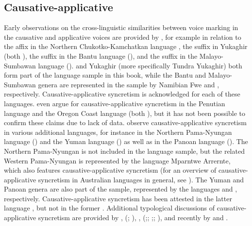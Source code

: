 \subsection{Causative-applicative} \label{sec:simple-syncretism:caus-appl}
Early observations on the cross-linguistic similarities between voice marking in the causative and applicative voices are provided by \cite[36f.]{nedjalkov:silnickij:1969}, for example in relation to the affix  in the Northern Chukotko-Kamchatkan language , the suffix  in Yukaghir (both ), the suffix  in the Bantu language  (), and the suffix  in the Malayo-Sumbawan language  ().  and Yukaghir (more specifically Tundra Yukaghir) both form part of the language sample in this book, while the Bantu and Malayo-Sumbawan genera are represented in the sample by Namibian Fwe and , respectively. Causative-applicative syncretism is acknowledged for each of these languages. \citeauthor{nedjalkov:silnickij:1969} even argue for causative-applicative syncretism in the Penutian language  and the Oregon Coast language  (both ), but it has not been possible to confirm these claims due to lack of data. \cite[116ff.]{shibatani:pardeshi:2002} observe cau\-sa\-tive-applicative syncretism in various additional languages, for instance in the Northern Pama-Nyungan language  () and the Yuman language  () as well as in the Panoan language  (). The Northern Pama-Nyungan  is not included in the language sample, but the related Western Pama-Nyungan  is represented by the language Mparntwe Arrernte, which also features causative-applicative syncretism (for an overview of causative-applicative syncretism in Australian languages in general, see \citealt{austin:2005}). The Yuman and Panoan genera are also part of the sample, represented by the languages  and , respectively. Causative-applicative syncretism has been attested in the latter language \citep{tallman:2018}, but not in the former \citep{miller:a:2001}. Additional typological discussions of causative-applicative syncretism are provided by \cite[183]{comrie:1989}, \citeauthor{kulikov:2001} (\citeyear[984]{kulikov:2001}; \citeyear[394]{kulikov:2010}), \cite[1139]{haspelmath:muller-bardey:2004}, \citeauthor{malchukov:2015} (\citeyear[115f.]{malchukov:2015};; \citeyear[403ff.]{malchukov:2016};; \citeyear[6ff., 9ff.]{malchukov:2017}), and recently by \cite[234ff.]{zuniga:kittila:2019} and \cite{franco:2019}.	

